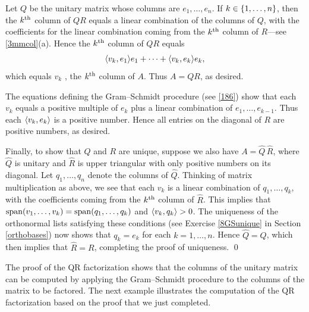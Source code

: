 Let $Q$ be the unitary matrix whose columns are $e_1, \ldots, e_n$. If $k \in \{1, \ldots, n\}$, then the $k^{\text{{th}}}$ column of $QR$ equals a linear combination of the columns of $Q$, with the coefficients for the linear combination coming from the $k^{\text{{th}}}$ column of $R$---see \ref{3mmcol}(a). Hence the $k^{\text{{th}}}$ column of $QR$ equals
\[
\langle v_k, e_1\rangle e_1 + \cdots + \langle v_k, e_k\rangle e_k,
\]
which equals $v_k$ , the $k^{\text{{th}}}$ column of $A$. Thus $A = QR$, as desired.

The equations defining the Gram--Schmidt procedure (see \ref{186}) show that each $v_k$ equals a positive multiple of $e_k$ plus a linear combination of $e_1, \ldots, e_{k-1}$. Thus each $\langle v_k, e_k\rangle$ is a positive number. Hence all entries on the diagonal of $R$ are positive numbers, as desired.

Finally, to show that $Q$ and $R$ are unique, suppose we also have $A = \hat{Q} \, \hat{R}$, where $\hat{Q}$ is unitary and $\hat{R}$ is upper triangular with only positive numbers on its diagonal. Let $q_1, \ldots, q_n$ denote the columns of $\hat{Q}$. Thinking of matrix multiplication as above, we see that each $v_k$ is a linear combination of $q_1, \ldots, q_k$, with the coefficients coming from the $k^{\text{{th}}}$ column of $\hat{R}$. This implies that $\operatorname{span}(v_1, \ldots, v_k) = \operatorname{span}(q_1, \ldots, q_k)$ and $\langle v_k, q_k\rangle > 0$. The uniqueness of the orthonormal lists satisfying these conditions (see Exercise \ref{8GSunique} in Section \ref{orthobases}) now shows that $q_k = e_k$ for each $k = 1, \ldots, n$. Hence $\hat{Q} = Q$, which then implies that $\hat{R} = R$, completing the proof of uniqueness.
\qed

\pagebreak[3]

The proof of the QR factorization shows that the columns of the unitary matrix can be computed by applying the Gram--Schmidt procedure to the columns of the matrix to be factored. The next example illustrates the computation of the QR factorization based on the proof that we just completed.

